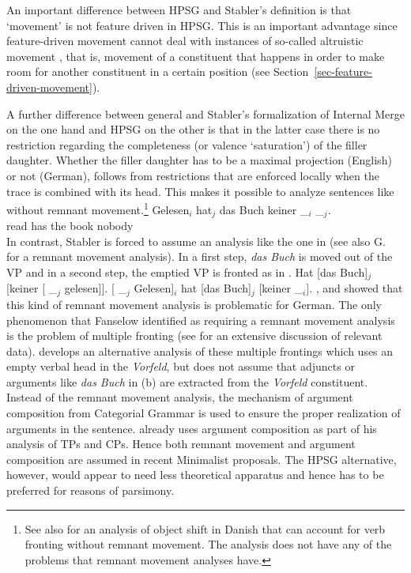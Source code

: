 An important difference between HPSG and Stabler's definition is that `movement' is not feature
driven in HPSG. This is an important advantage since feature-driven movement cannot deal with
instances of so-called altruistic movement \citep{Fanselow2003b}, that is, movement of a constituent that happens
in order to make room for another constituent in a certain position (see Section~\ref{sec-feature-driven-movement}).

A further difference between general \xbart and Stabler's formalization of Internal Merge on the
one hand and HPSG on the other is that in the latter case there is no restriction regarding the
completeness (or valence `saturation') of the filler daughter. Whether the filler daughter has to be
a maximal projection (English) or not (German), follows from restrictions that are enforced locally
when the trace is combined with its head. This makes it possible to analyze sentences like 
without remnant movement.\footnote{%
  See also  for an analysis of object shift in Danish that can account for verb
  fronting without remnant movement. The analysis does not have any of the problems that remnant
  movement analyses have.
}
\ea
\gll Gelesen$_i$ hat$_j$ das Buch keiner \_$_i$ \_$_j$.\\
     read        has     the book nobody\\
\z
In contrast, Stabler is forced to assume an analysis like the one in  (see also G.\
 for a remnant movement analysis). In a first step, \emph{das Buch} is moved out
of the VP \pmexa{1} and in a second step, the emptied VP is fronted as in \pmexb{1}.
\eal
\ex {}Hat [das Buch]$_j$ [keiner [ \_$_j$ gelesen]].
\ex {}[\sub{VP} \_$_j$ Gelesen]$_i$ hat [das Buch]$_j$ [keiner \_$_i$].
\zl
\citet[]{Haider93a}, %
\citet[Section~2]{dKM2001a} and \citet{Fanselow2002a} showed that this kind of remnant movement analysis is problematic for German. The
only phenomenon that Fanselow identified as requiring a remnant
movement analysis is the problem of multiple fronting
(see \citew{Mueller2003b} for an extensive discussion of relevant
data). \citet{Mueller2005c,Mueller2005d,MuellerGS} develops an alternative analysis of these multiple 
frontings which uses an empty verbal head in the \emph{Vorfeld}, but does not assume that
adjuncts or arguments like \emph{das Buch} in (\mex{0}b) are 
extracted from the \emph{Vorfeld} constituent. Instead of the remnant movement analysis, the
mechanism of argument composition from Categorial Grammar \citep{Geach70a,HN94a} is used to ensure the proper realization
of arguments in the sentence. \citet[\page 20]{Chomsky2007a} already uses argument composition as part of
his analysis of TPs and CPs. Hence both remnant movement and argument composition are assumed in
recent Minimalist proposals. The HPSG alternative, however,  would appear to need less theoretical
apparatus and hence has to be preferred for reasons of parsimony. 

